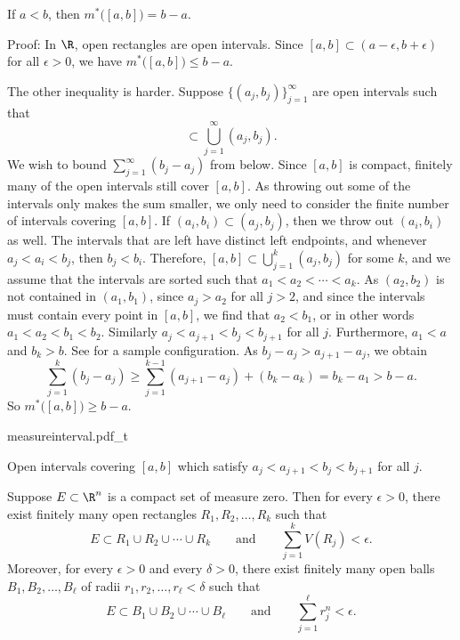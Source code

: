 \begin{example}
If $a < b$, then $m^*\bigl([a,b]\bigr) = b-a$.

Proof:
In $\R$, open rectangles are open intervals.
Since $[a,b] \subset (a-\epsilon,b+\epsilon)$ for all $\epsilon > 0$,
we have
$m^*\bigl([a,b]\bigr) \leq b-a$.

The other inequality is harder.
Suppose $\bigl\{ (a_j,b_j) \bigr\}_{j=1}^\infty$ are open intervals such that
\begin{equation*}
[a,b] \subset \bigcup_{j=1}^\infty (a_j,b_j) .
\end{equation*}
We wish to bound $\sum_{j=1}^\infty (b_j-a_j)$ from below.
Since $[a,b]$ is compact, finitely many of the open intervals
still cover $[a,b]$.  As throwing out some of the intervals only makes the
sum smaller, we only need to consider the finite number of intervals
covering $[a,b]$.
If $(a_i,b_i) \subset (a_j,b_j)$, then we throw out
$(a_i,b_i)$ as well.
The intervals that are left
have distinct left endpoints, and whenever
$a_j < a_i < b_j$, then $b_j < b_i$.
Therefore,
$[a,b] \subset \bigcup_{j=1}^k (a_j,b_j)$ for some $k$, and
we assume that the intervals are sorted such that $a_1 < a_2 < \cdots <
a_k$.  As $(a_2,b_2)$ is not contained in $(a_1,b_1)$,
since $a_j > a_2$ for all $j > 2$, and since the intervals
must contain every point in $[a,b]$, we find that $a_2 < b_1$, or in
other words
$a_1 < a_2 < b_1 < b_2$.  Similarly
$a_j < a_{j+1} < b_j < b_{j+1}$ for all $j$.
Furthermore, $a_1 < a$ and $b_k > b$.
See  for a sample configuration.
As $b_j-a_j > a_{j+1}-a_j$, we obtain
\begin{equation*}
\sum_{j=1}^k (b_j-a_j)
\geq
\sum_{j=1}^{k-1} (a_{j+1}-a_j)
+
(b_k-a_k)
=
b_k-a_1 > b-a .
\end{equation*}
So $m^*\bigl([a,b]\bigr) \geq b-a$.
\begin{myfigureht}
{measureinterval.pdf_t}
\caption{Open intervals covering $[a,b]$ which satisfy
$a_j < a_{j+1} < b_j < b_{j+1}$ for all $j$.\label{fig:measureinterval}}
\end{myfigureht}
\end{example}

\begin{prop} \label{mv:prop:compactnull}
Suppose $E \subset \R^n$ is a compact set of measure zero.  Then for
every $\epsilon > 0$, there exist
finitely many open rectangles $R_1,R_2,\ldots,R_k$ such that
\begin{equation*}
E \subset R_1 \cup R_2 \cup \cdots \cup R_k
\qquad \text{and} \qquad
\sum_{j=1}^k V(R_j) < \epsilon.
\end{equation*}
Moreover, for every $\epsilon > 0$ and every $\delta > 0$,
there exist finitely many open balls $B_1,B_2,\ldots,B_{\ell}$ of radii
$r_1,r_2,\ldots,r_{\ell} < \delta$ such that
\begin{equation*}
E \subset B_1 \cup B_2 \cup \cdots \cup B_{\ell}
\qquad \text{and} \qquad
\sum_{j=1}^{\ell} r_j^n < \epsilon.
\end{equation*}
\end{prop}

